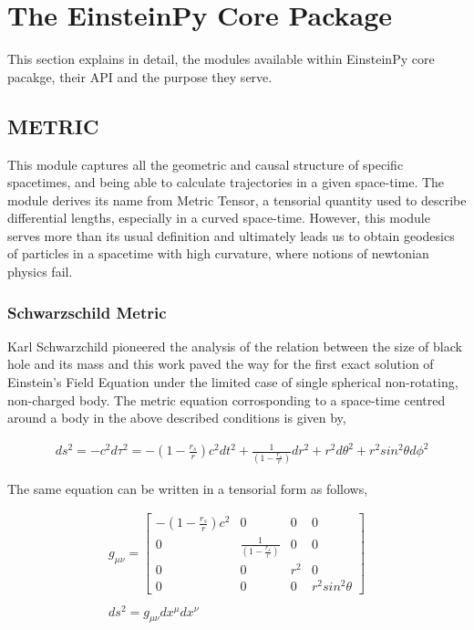 \documentclass{aastex63}
\begin{document}
\section{The EinsteinPy Core Package} \label{sec:CORE}
This section explains in detail, the modules available within EinsteinPy core pacakge, their API and the purpose they serve.
\subsection{METRIC} \label{subsec:metric}
This module captures all the geometric and causal structure of specific spacetimes, and being able to calculate trajectories in a given space-time. 
The module derives its name from Metric Tensor, a tensorial quantity used to describe differential lengths, especially in a curved space-time. 
However, this module serves more than its usual definition and ultimately leads us to obtain geodesics of particles in a spacetime with high curvature, where notions of newtonian physics fail.
\subsubsection{Schwarzschild Metric} \label{subsubsec:sch}
Karl Schwarzchild pioneered the analysis of the relation between the size of black hole and its mass and this work paved the way for the first exact solution of Einstein's Field Equation under the limited case of single spherical non-rotating, non-charged body. 
The metric equation corrosponding to a space-time centred around a body in the above described conditions is given by,

\begin{align}
& ds^2 = -c^2 d\tau ^2 = - (1 - \frac{r_s}{r})c^2 dt^2  + \frac{1}{(1 - \frac{r_s}{r})}dr^2 + r^2 d\theta ^2 + r^2 sin^2 \theta d\phi ^2
\end{align}

The same equation can be written in a tensorial form as follows,

\begin{gather}
g_{\mu \nu} = \begin{bmatrix} - (1 - \frac{r_s}{r})c^2 & 0 & 0 & 0 \\ 0 & \frac{1}{(1 - \frac{r_s}{r})} & 0 & 0 \\ 0 & 0 & r^2 & 0 \\ 0 & 0 & 0 &  r^2 sin^2 \theta \end{bmatrix} \\ 
\nonumber \\
ds^2 = g_{\mu \nu} dx^\mu dx^\nu
\end{gather}
\end{document}
